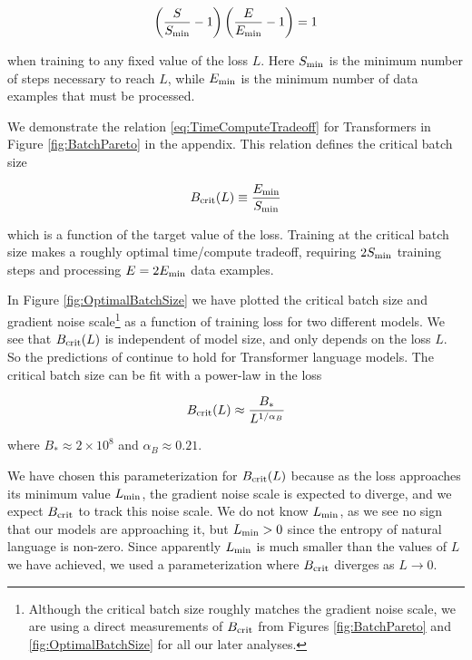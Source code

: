 \begin{equation}
\label{eq:TimeComputeTradeoff}
\left( \frac{S}{S_{\rm min}} -1 \right) \left( \frac{E}{E_{\rm min}} - 1 \right) = 1
\end{equation}

when training to any fixed value of the loss $L$.  Here $S_{\rm min}$ is the minimum number of steps necessary to reach $L$, while $E_{\rm min}$ is the minimum number of data examples that must be processed. 

We demonstrate the relation \eqref{eq:TimeComputeTradeoff} for Transformers in Figure \ref{fig:BatchPareto} in the appendix. This relation defines the critical batch size

\begin{equation}
\label{eq:DefinitionBcrit}
B_{\rm crit}(L) \equiv \frac{E_{\rm min}}{S_{\rm min}}
\end{equation}

which is a function of the target value of the loss.  Training at the critical batch size makes a roughly optimal time/compute tradeoff, requiring $2 S_{\rm min}$ training steps and processing $E = 2 E_{\rm min}$ data examples.  

In Figure \ref{fig:OptimalBatchSize} we have plotted the critical batch size and gradient noise scale\footnote{Although the critical batch size roughly matches the gradient noise scale, we are using a direct measurements of $B_{\rm crit}$ from Figures \ref{fig:BatchPareto} and \ref{fig:OptimalBatchSize} for all our later analyses.  } as a function of training loss for two different models.  We see that $B_{\rm crit}(L)$ is  independent of model size, and only depends on the loss $L$.  So the predictions of \cite{1812.06162} continue to hold for Transformer language models.  The critical batch size can be fit with a power-law in the loss

\begin{equation}
B_{\rm crit}(L) \approx \frac{B_*}{L^{1/\alpha_B}}
\end{equation}

where $B_* \approx 2 \times 10^8$ and $\alpha_B \approx 0.21$.  

We have chosen this parameterization for $B_{\rm crit}(L)$ because as the loss approaches its minimum value $L_{\rm min}$, the gradient noise scale is expected to diverge, and we expect $B_{\rm crit}$ to track this noise scale.  We do not know $L_{\rm min}$, as we see no sign that our models are approaching it, but $L_{\rm min} > 0$ since the entropy of natural language is non-zero.  Since apparently $L_{\rm min}$ is much smaller than the values of $L$ we have achieved, we used a parameterization where $B_{\rm crit}$ diverges as $L \to 0$. 

